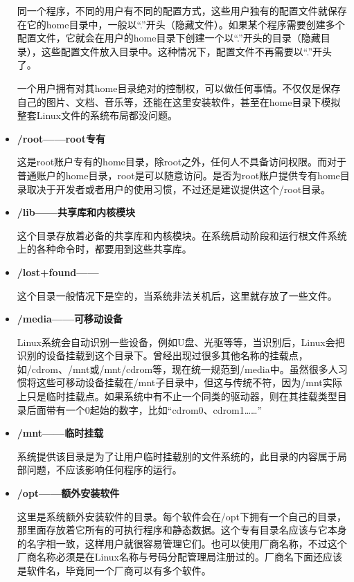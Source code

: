 \begin{itemize}
\qquad 同一个程序，不同的用户有不同的配置方式，这些用户独有的配置文件就保存在它的home目录中，一般以“.”开头（隐藏文件）。如果某个程序需要创建多个配置文件，它就会在用户的home目录下创建一个以“.”开头的目录（隐藏目录），这些配置文件放入目录中。这种情况下，配置文件不再需要以“.”开头了。

\qquad 一个用户拥有对其home目录绝对的控制权，可以做任何事情。不仅仅是保存自己的图片、文档、音乐等，还能在这里安装软件，甚至在home目录下模拟整套Linux文件的系统布局都没问题。

\item \textbf{/root——root专有}

\qquad 这是root账户专有的home目录，除root之外，任何人不具备访问权限。而对于普通账户的home目录，root是可以随意访问。是否为root账户提供专有home目录取决于开发者或者用户的使用习惯，不过还是建议提供这个/root目录。

\item \textbf{/lib——共享库和内核模块}

\qquad 这个目录存放着必备的共享库和内核模块。在系统启动阶段和运行根文件系统上的各种命令时，都要用到这些共享库。

\item \textbf{/lost+found——}

\qquad 这个目录一般情况下是空的，当系统非法关机后，这里就存放了一些文件。

\item \textbf{/media——可移动设备}

\qquad Linux系统会自动识别一些设备，例如U盘、光驱等等，当识别后，Linux会把识别的设备挂载到这个目录下。曾经出现过很多其他名称的挂载点，如/cdrom、/mnt或/mnt/cdrom等，现在统一规范到/media中。虽然很多人习惯将这些可移动设备挂载在/mnt子目录中，但这与传统不符，因为/mnt实际上只是临时挂载点。如果系统中有不止一个同类的驱动器，则在其挂载类型目录后面带有一个0起始的数字，比如“cdrom0、cdrom1……”

\item \textbf{/mnt——临时挂载}

\qquad 系统提供该目录是为了让用户临时挂载别的文件系统的，此目录的内容属于局部问题，不应该影响任何程序的运行。

\item \textbf{/opt——额外安装软件}

\qquad 这里是系统额外安装软件的目录。每个软件会在/opt下拥有一个自己的目录，那里面存放着它所有的可执行程序和静态数据。这个专有目录名应该与它本身的名字相一致，这样用户就很容易管理它们。也可以使用厂商名称，不过这个厂商名称必须是在Linux名称与号码分配管理局注册过的。厂商名下面还应该是软件名，毕竟同一个厂商可以有多个软件。


\end{itemize}
